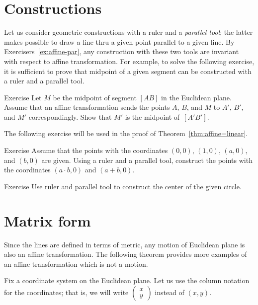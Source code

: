 \section*{Constructions}

Let us consider geometric constructions with a ruler and a \emph{parallel tool};
the latter makes possible to draw a line thru a given point parallel to a given line.
By Exercisers~\ref{ex:affine-par}, any construction with these two tools are invariant with respect to affine transformation.
For example, 
to solve the following exercise,
it is sufficient to prove that midpoint of a given segment can be constructed with a ruler and a parallel tool.

\begin{thm}{Exercise}\label{ex:midpoint-affine}
Let $M$ be the midpoint of segment $[AB]$ in the Euclidean plane.
Assume that an affine transformation sends the points $A$, $B$, and $M$
to $A'$, $B'$, and $M'$ correspondingly.
Show that $M'$ is the midpoint of~$[A'B']$.
\end{thm}

The following exercise will be used in the proof of Theorem~\ref{thm:affine=linear}.

\begin{thm}{Exercise}\label{ex:R-hom}
Assume that the points with the coordinates $(0,0)$, $(1,0)$, $(a,0)$, and $(b,0)$ are given.
Using a ruler and a parallel tool, construct the points with the coordinates $(a\cdot b,0)$ and $(a+b,0)$.
\end{thm}

\begin{thm}{Exercise}\label{ex:center-circ-affine}
Use ruler and parallel tool to construct the center of the given circle.
\end{thm}

\section*{Matrix form}

Since the lines are defined in terms of metric, any motion of Euclidean plane is also an affine transformation.
The following theorem provides more examples of an affine transformation which is not a motion.

Fix a coordinate system on the Euclidean plane.
Let us use the column notation for the coordinates;
that is, we will write $\left(\begin{smallmatrix}
x\\y
\end{smallmatrix} \right)$ instead of $(x,y)$.


